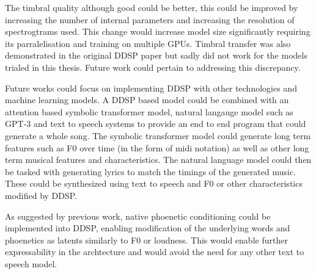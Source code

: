 The timbral quality although good could be better, this could be improved by increasing the number of internal parameters and increasing the resolution of spectrogtrams used. This change would increase model size significantly requiring its parralelisation and training on multiple GPUs. Timbral transfer was also demonstrated in the original DDSP paper but sadly did not work for the models trialed in this thesis. Future work could pertain to addressing this discrepancy.

Future works could focus on implementing DDSP with other technologies and machine learning models. A DDSP based model could be combined with an attention based symbolic transformer model, natural langauge model such as GPT-3\cite{GPT3} and text to speech systems to provide an end to end program that could generate a whole song. The symbolic transformer model could generate long term features such as F0 over time (in the form of midi notation) as well as other long term musical features and characteristics. The natural language model could then be tasked with generating lyrics to match the timings of the generated music. These could be synthesized using text to speech and F0 or other characteristics modified by DDSP.

As suggested by previous work\cite{SingingDDSP}, native phoenetic conditioning could be implemented into DDSP, enabling modification of the underlying words and phoenetics as latents similarly to F0 or loudness. This would enable further expressability in the archtecture and would avoid the need for any other text to speech model.